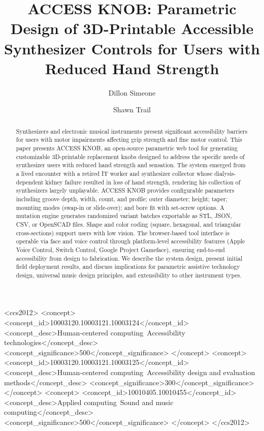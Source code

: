 \documentclass[sigconf]{nimeart}
\begin{document}
\title{ACCESS KNOB: Parametric Design of 3D-Printable Accessible Synthesizer Controls for Users with Reduced Hand Strength}

\author{Dillon Simeone}

\author{Shawn Trail}


\begin{abstract}
Synthesizers and electronic musical instruments present significant accessibility barriers for users with motor impairments affecting grip strength and fine motor control. This paper presents ACCESS KNOB, an open-source parametric web tool for generating customizable 3D-printable replacement knobs designed to address the specific needs of synthesizer users with reduced hand strength and sensation. The system emerged from a lived encounter with a retired IT worker and synthesizer collector whose dialysis-dependent kidney failure resulted in loss of hand strength, rendering his collection of synthesizers largely unplayable. ACCESS KNOB provides configurable parameters including groove depth, width, count, and profile; outer diameter; height; taper; mounting modes (swap-in or slide-over); and bore fit with set-screw options. A mutation engine generates randomized variant batches exportable as STL, JSON, CSV, or OpenSCAD files. Shape and color coding (square, hexagonal, and triangular cross-sections) support users with low vision. The browser-based tool interface is operable via face and voice control through platform-level accessibility features (Apple Voice Control, Switch Control, Google Project Gameface), ensuring end-to-end accessibility from design to fabrication. We describe the system design, present initial field deployment results, and discuss implications for parametric assistive technology design, universal music design principles, and extensibility to other instrument types.
\end{abstract}

\begin{CCSXML}
<ccs2012>
<concept>
<concept_id>10003120.10003121.10003124</concept_id>
<concept_desc>Human-centered computing~Accessibility technologies</concept_desc>
<concept_significance>500</concept_significance>
</concept>
<concept>
<concept_id>10003120.10003121.10003125</concept_id>
<concept_desc>Human-centered computing~Accessibility design and evaluation methods</concept_desc>
<concept_significance>300</concept_significance>
</concept>
<concept>
<concept_id>10010405.10010455</concept_id>
<concept_desc>Applied computing~Sound and music computing</concept_desc>
<concept_significance>500</concept_significance>
</concept>
</ccs2012>
\end{CCSXML}
\end{document}
